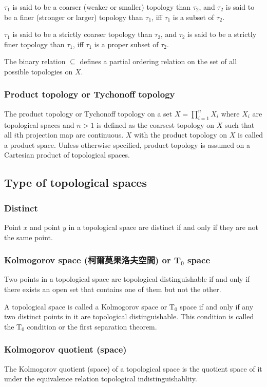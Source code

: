\documentclass[a4paper,12pt]{article}
\begin{document}
$\tau_1$ is said to be a coarser (weaker or smaller) topology than $\tau_2$, and $\tau_2$ is said to be a finer (stronger or larger) topology than $\tau_1$, iff $\tau_1$ is a subset of $\tau_2$.

$\tau_1$ is said to be a strictly coarser topology than $\tau_2$, and $\tau_2$ is said to be a strictly finer topology than $\tau_1$, iff $\tau_1$ is a proper subset of $\tau_2$.

The binary relation $\subseteq$ defines a partial ordering relation on the set of all possible topologies on $X$.
\subsubsection{Product topology or Tychonoff topology}
The product topology or Tychonoff topology on a set $X=\prod_{i=1}^nX_i$ where $X_i$ are topological spaces and $n>1$ is defined as the coarsest topology on $X$ such that all $i$th projection map are continuous. $X$ with the product topology on $X$ is called a product space. Unless otherwise specified, product topology is assumed on a Cartesian product of topological spaces.
\subsection{Type of topological spaces}
\subsubsection{Distinct}
Point $x$ and point $y$ in a topological space are distinct if and only if they are not the same point.
\subsubsection{Kolmogorov space (柯爾莫果洛夫空間) or T$_0$ space}
Two points in a topological space are topological distinguishable if and only if there exists an open set that contains one of them but not the other.

A topological space is called a Kolmogorov space or T$_0$ space if and only if any two distinct points in it are topological distinguishable. This condition is called the T$_0$ condition or the first separation theorem.
\subsubsection{Kolmogorov quotient (space)}
The Kolmogorov quotient (space) of a topological space is the quotient space of it under the equivalence relation topological indistinguishablity.
\end{document}
